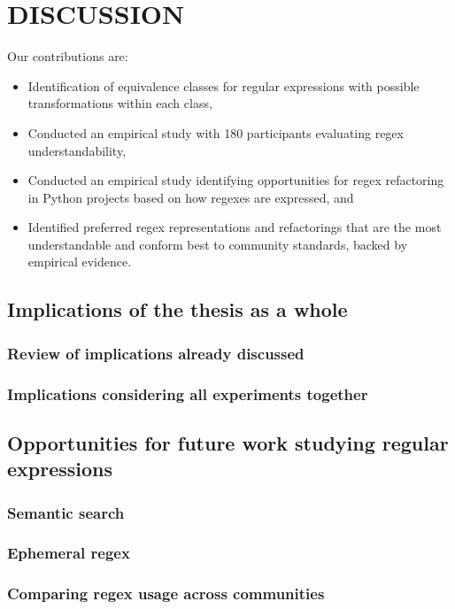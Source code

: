 \chapter{DISCUSSION}

Our contributions are:
\begin{itemize}
\item Identification of  equivalence classes for regular expressions with possible transformations within each class,
\item Conducted an empirical study with 180 participants evaluating regex understandability,
\item Conducted an empirical study identifying opportunities for regex refactoring  in Python projects based on how regexes are expressed, and
\item {Identified preferred regex representations and refactorings that are the most understandable and conform best to community standards, backed by empirical evidence.}
\end{itemize}

\section{Implications of the thesis as a whole}
\subsection{Review of implications already discussed}
\subsection{Implications considering all experiments together}

\section{Opportunities for future work studying regular expressions}
\subsection{Semantic search}
\subsection{Ephemeral regex}
\subsection{Comparing regex usage across communities}
